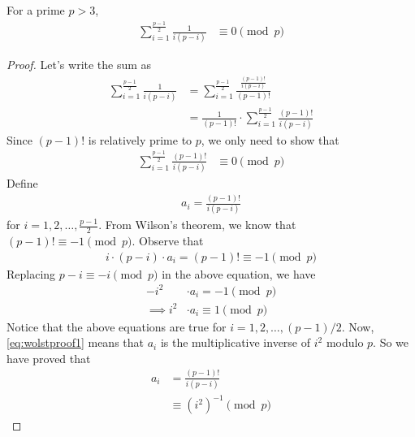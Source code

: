 \documentclass[12pt]{subfile}
\begin{document}
		\begin{lemma}\label{lem:wolstproof4}
			For a prime $p>3$,
				\begin{align*}
					\sum_{i=1}^{\frac{p-1}{2}} \frac{1}{i(p-i)}
						& \equiv 0 \pmod p
				\end{align*}
		\end{lemma}

		\begin{proof}
			Let's write the sum as
				\begin{align*}
					\sum_{i=1}^{\frac{p-1}{2}} \frac{1}{i(p-i)}
						& = \sum_{i=1}^{\frac{p-1}{2}} \frac{\frac{(p-1)!}{i(p-i)}}{(p-1)!}\\
						& = \frac{1}{(p-1)!} \cdot \sum_{i=1}^{\frac{p-1}{2}} \frac{(p-1)!}{i(p-i)}
				\end{align*}
			Since $(p-1)!$ is relatively prime to $p$, we only need to show that
				\begin{align*}
					\sum_{i=1}^{\frac{p-1}{2}} \frac{(p-1)!}{i(p-i)}
						& \equiv 0 \pmod p
				\end{align*}
			Define
				\begin{align*}
					a_i = \frac{(p-1)!}{i(p-i)}
				\end{align*}
			for $i=1,2,\ldots,\frac{p-1}{2}$. From Wilson's theorem, we know that $(p-1)! \equiv -1 \pmod p$. Observe that
				\begin{align*}
					i\cdot (p-i) \cdot a_i = (p-1)! \equiv -1 \pmod p
				\end{align*}
			Replacing $p-i \equiv -i \pmod p$ in the above equation, we have
				\begin{align}\label{eq:wolstproof1}
					-i^2
						& \cdot a_i = -1 \pmod p\\
					\implies i^2
						& \cdot a_i \equiv 1 \pmod p
				\end{align}
			Notice that the above equations are true for $i=1,2,\ldots,(p-1)/2$. Now, \eqref{eq:wolstproof1} means that $a_i$ is the multiplicative inverse of $i^2$ modulo $p$. So we have proved that
				\begin{align}\label{eq:wolstproof2}
					a_i
						& = \frac{(p-1)!}{i(p-i)}\\
						& \equiv (i^2)^{-1} \pmod p
				\end{align}

\end{proof}
\end{document}
